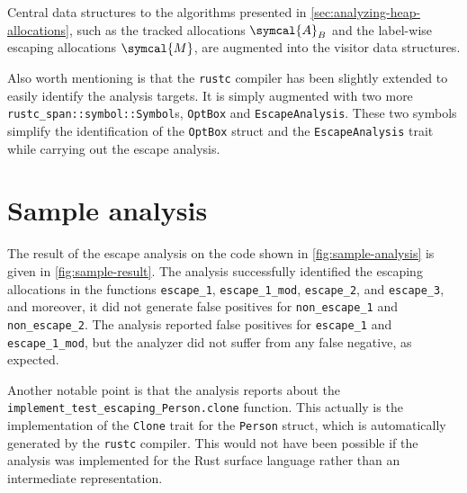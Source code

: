 \documentclass[en]{snu-ece-bsc-thesis}
\theoremstyle{definition}
\begin{document}
Central data structures to the algorithms presented in \autoref{sec:analyzing-heap-allocations}, such as the tracked allocations $\symcal{A}_B$ and the label-wise escaping allocations $\symcal{M}$, are augmented into the visitor data structures.

Also worth mentioning is that the \verb/rustc/ compiler has been slightly extended to easily identify the analysis targets.
It is simply augmented with two more \verb/rustc_span::symbol::Symbol/s, \verb/OptBox/ and \verb/EscapeAnalysis/.
These two symbols simplify the identification of the \verb/OptBox/ struct and the \verb/EscapeAnalysis/ trait while carrying out the escape analysis.

\section{Sample analysis}
The result of the escape analysis on the code shown in \autoref{fig:sample-analysis} is given in \autoref{fig:sample-result}.
The analysis successfully identified the escaping allocations in the functions \verb/escape_1/, \verb/escape_1_mod/, \verb/escape_2/, and \verb/escape_3/, and moreover, it did not generate false positives for \verb/non_escape_1/ and \verb/non_escape_2/.
The analysis reported false positives for \verb/escape_1/ and \verb/escape_1_mod/, but the analyzer did not suffer from any false negative, as expected.

Another notable point is that the analysis reports about the \verb/implement_test_escaping_Person.clone/ function.
This actually is the implementation of the \verb/Clone/ trait for the \verb/Person/ struct, which is automatically generated by the \verb/rustc/ compiler.
This would not have been possible if the analysis was implemented for the Rust surface language rather than an intermediate representation.
\end{document}
